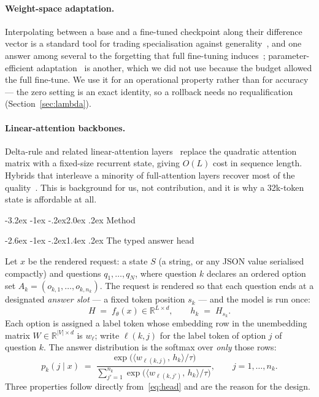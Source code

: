 \documentclass[11pt]{article}
\makeatletter
\renewcommand\section{\@startsection{section}{1}{\z@}%
  {-3.2ex \@plus -1ex \@minus -.2ex}{2.0ex \@plus.2ex}%
  {\normalfont\large\bfseries\color{accent}}}
\renewcommand\subsection{\@startsection{subsection}{2}{\z@}%
  {-2.6ex \@plus -1ex \@minus -.2ex}{1.4ex \@plus.2ex}%
  {\normalfont\normalsize\bfseries\color{accent!85!black}}}
\newcommand{\1}{\mathbf{1}}
\makeatother
\begin{document}
\paragraph{Weight-space adaptation.} Interpolating between a base and a fine-tuned checkpoint along
their difference vector is a standard tool for trading specialisation against
generality~\cite{ilharco2023editing,wortsman2022model,yadav2023ties}, and one answer among several
to the forgetting that full fine-tuning induces~\cite{kirkpatrick2017overcoming}; parameter-efficient
adaptation~\cite{hu2022lora} is another, which we did not use because the budget allowed the full
fine-tune. We use it
for an operational property rather than for accuracy --- the zero setting is an exact identity, so a
rollback needs no requalification (Section~\ref{sec:lambda}).

\paragraph{Linear-attention backbones.} Delta-rule and related linear-attention
layers~\cite{katharopoulos2020transformers,yang2024gated} replace the quadratic attention matrix
with a fixed-size recurrent state, giving $O(L)$ cost in sequence length. Hybrids that interleave a
minority of full-attention layers recover most of the quality~\cite{yang2025qwen3}. This is
background for us, not contribution, and it is why a 32k-token state is affordable at all.

\section{Method}

\subsection{The typed answer head}
\label{sec:head}

Let $x$ be the rendered request: a state $S$ (a string, or any JSON value serialised compactly) and
questions $q_1,\dots,q_N$, where question $k$ declares an ordered option set
$A_k = (o_{k,1},\dots,o_{k,n_k})$. The request is rendered so that each question ends at a
designated \emph{answer slot} --- a fixed token position $s_k$ --- and the model is run once:
\begin{equation}
H \;=\; f_\theta(x) \in \mathbb{R}^{L \times d},
\qquad
h_k \;=\; H_{s_k} .
\end{equation}
Each option is assigned a label token whose embedding row in the unembedding matrix $W \in
\mathbb{R}^{|V| \times d}$ is $w_{\ell}$; write $\ell(k,j)$ for the label token of option $j$ of
question $k$. The answer distribution is the softmax over \emph{only} those rows:
\begin{equation}
p_k(j \mid x) \;=\;
\frac{\exp\!\big(\langle w_{\ell(k,j)},\, h_k\rangle / \tau\big)}
     {\sum_{j'=1}^{n_k} \exp\!\big(\langle w_{\ell(k,j')},\, h_k\rangle / \tau\big)},
\qquad j = 1,\dots,n_k .
\label{eq:head}
\end{equation}
Three properties follow directly from~\eqref{eq:head} and are the reason for the design.
\end{document}
